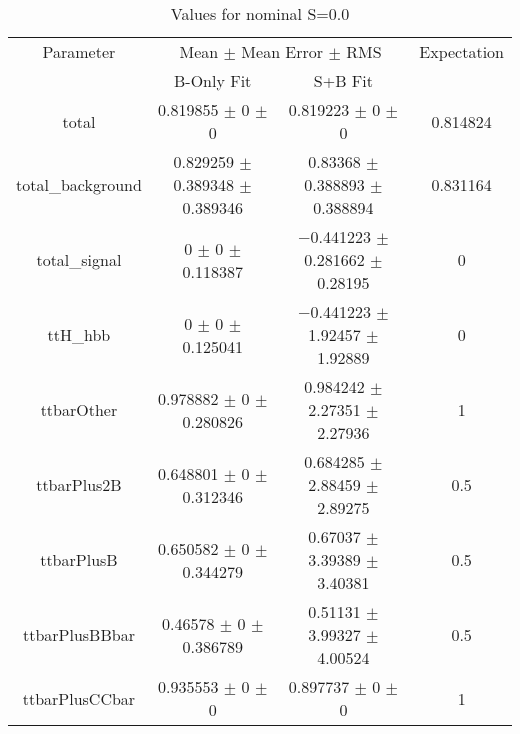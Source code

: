 \begin{table}
\centering
\caption{Values for nominal S=0.0}
\begin{tabular}{cccc}
\toprule
Parameter & \multicolumn{2}{c}{Mean $\pm$ Mean Error $\pm$ RMS} & Expectation\\
 & B-Only Fit & S+B Fit & \\
\midrule
total & \num{0.819855} $\pm$ \num{0} $\pm$ \num{0} & \num{0.819223} $\pm$ \num{0} $\pm$ \num{0} & \num{0.814824}\\
total\_background & \num{0.829259} $\pm$ \num{0.389348} $\pm$ \num{0.389346} & \num{0.83368} $\pm$ \num{0.388893} $\pm$ \num{0.388894} & \num{0.831164}\\
total\_signal & \num{0} $\pm$ \num{0} $\pm$ \num{0.118387} & \num{-0.441223} $\pm$ \num{0.281662} $\pm$ \num{0.28195} & \num{0}\\
ttH\_hbb & \num{0} $\pm$ \num{0} $\pm$ \num{0.125041} & \num{-0.441223} $\pm$ \num{1.92457} $\pm$ \num{1.92889} & \num{0}\\
ttbarOther & \num{0.978882} $\pm$ \num{0} $\pm$ \num{0.280826} & \num{0.984242} $\pm$ \num{2.27351} $\pm$ \num{2.27936} & \num{1}\\
ttbarPlus2B & \num{0.648801} $\pm$ \num{0} $\pm$ \num{0.312346} & \num{0.684285} $\pm$ \num{2.88459} $\pm$ \num{2.89275} & \num{0.5}\\
ttbarPlusB & \num{0.650582} $\pm$ \num{0} $\pm$ \num{0.344279} & \num{0.67037} $\pm$ \num{3.39389} $\pm$ \num{3.40381} & \num{0.5}\\
ttbarPlusBBbar & \num{0.46578} $\pm$ \num{0} $\pm$ \num{0.386789} & \num{0.51131} $\pm$ \num{3.99327} $\pm$ \num{4.00524} & \num{0.5}\\
ttbarPlusCCbar & \num{0.935553} $\pm$ \num{0} $\pm$ \num{0} & \num{0.897737} $\pm$ \num{0} $\pm$ \num{0} & \num{1}\\
\bottomrule
\end{tabular}
\end{table}